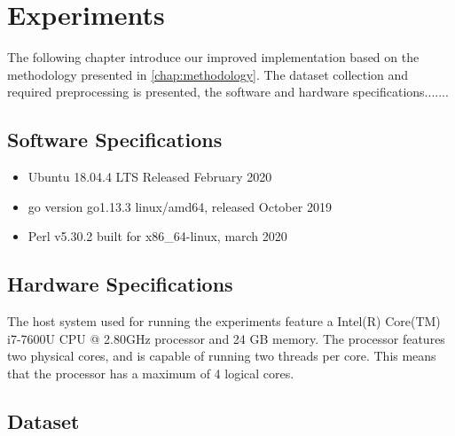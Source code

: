 \chapter{Experiments}
\label{chap:experiments}
The following chapter introduce our improved implementation based on the methodology presented in \cref{chap:methodology}. The dataset collection and required preprocessing is presented, the software and hardware specifications.......

\iffalse
graph the dataset and look at peaks.
Then multiply by potential hosts in enterprise.
Then look at, are we able to handle that amount of events?
What if we use more rules?


The following chapter introduces the actual implementation of the experiment based on the methodology presented in Chapter 4. The collection of the data set, the software versions, the hardware
specifications and the used algorithms during the experiment are presented as well as the experimental design and the technical implementation. It demonstrates the technical execution of the
methodology for reproducibility of the use case.
\fi

\section{Software Specifications}
\label{sec:softwarespecs}

\begin{itemize}
    \item Ubuntu 18.04.4 LTS Released February 2020
    \item go version go1.13.3 linux/amd64, released October 2019
    \item Perl v5.30.2 built for x86\_64-linux, march 2020
\end{itemize}

\section{Hardware Specifications}
\label{sec:hardwarespecs}
The host system used for running the experiments feature a Intel(R) Core(TM) i7-7600U CPU @ 2.80GHz processor and 24 GB memory. The processor features two physical cores, and is capable of running two threads per core. This means that the processor has a maximum of 4 logical cores.

\section{Dataset}

